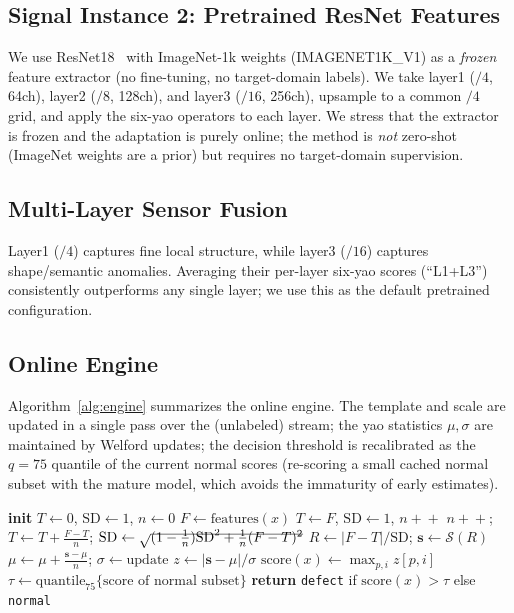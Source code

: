 \documentclass[preprint,12pt]{elsarticle}
\begin{document}
\subsection{Signal Instance 2: Pretrained ResNet Features}
We use ResNet18~\cite{he2016resnet} with ImageNet-1k weights
(IMAGENET1K\_V1) as a \emph{frozen} feature extractor (no fine-tuning, no
target-domain labels). We take layer1 ($/4$, 64ch), layer2 ($/8$, 128ch),
and layer3 ($/16$, 256ch), upsample to a common $/4$ grid, and apply the
six-yao operators to each layer. We stress that the extractor is frozen
and the adaptation is purely online; the method is \emph{not} zero-shot
(ImageNet weights are a prior) but requires no target-domain supervision.

\subsection{Multi-Layer Sensor Fusion}
Layer1 ($/4$) captures fine local structure, while layer3 ($/16$)
captures shape/semantic anomalies. Averaging their per-layer six-yao
scores (``L1+L3'') consistently outperforms any single layer; we use this
as the default pretrained configuration.

\subsection{Online Engine}
Algorithm~\ref{alg:engine} summarizes the online engine. The template and
scale are updated in a single pass over the (unlabeled) stream; the yao
statistics $\mu,\sigma$ are maintained by Welford updates; the decision
threshold is recalibrated as the $q{=}75$ quantile of the current normal
scores (re-scoring a small cached normal subset with the mature model,
which avoids the immaturity of early estimates).

\begin{algorithm}[t]
\caption{Online six-yao anomaly engine}
\label{alg:engine}
\begin{algorithmic}[1]
\State \textbf{init} $T\!\leftarrow\!0$, $\mathrm{SD}\!\leftarrow\!1$,
       $n\!\leftarrow\!0$
    \State $F\leftarrow\mathrm{features}(x)$
     $T\leftarrow F$, $\mathrm{SD}\leftarrow 1$, $n\!+\!+$
    \Else
        \State $n\!+\!+$;
               $T\leftarrow T+\frac{F-T}{n}$;
               $\mathrm{SD}\leftarrow\sqrt{\smash{(1-\tfrac1n)\mathrm{SD}^2+\tfrac1n(F-T)^2}}$
    \EndIf
    \State $R\leftarrow|F-T|/\mathrm{SD}$;
           $\mathbf{s}\leftarrow\mathcal{S}(R)$
    \State $\mu\leftarrow\mu+\frac{\mathbf{s}-\mu}{n}$;
           $\sigma\leftarrow\mathrm{update}$ 
    \State $z\leftarrow|\mathbf{s}-\mu|/\sigma$
    \State $\mathrm{score}(x)\leftarrow\max_{p,i} z[p,i]$
    \State $\tau\leftarrow\mathrm{quantile}_{75}\{\mathrm{score}\text{ of normal subset}\}$
    \State \textbf{return} \texttt{defect} if $\mathrm{score}(x)>\tau$ else \texttt{normal}
\EndFor
\end{algorithmic}
\end{algorithm}
\end{document}
